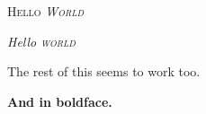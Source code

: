 \documentclass{article}
\begin{document}
\textsc{Hello \emph{World}}

\emph{Hello \textsc{world}}

The rest of this seems to work too.

\textbf{And in boldface.}
\end{document}
